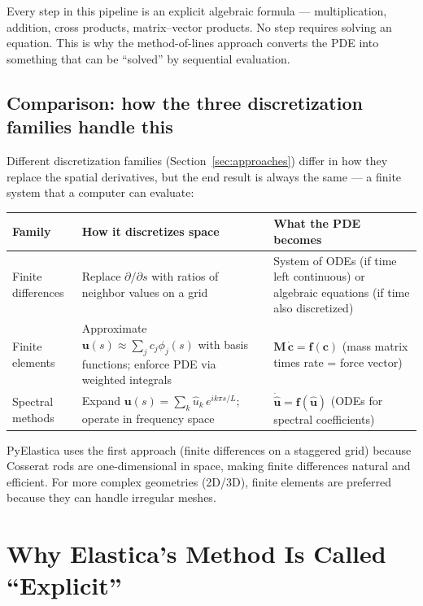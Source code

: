 \documentclass[11pt]{article}
\newcommand{\vect}[1]{\mathbf{#1}}
\newcommand{\mat}[1]{\mathbf{#1}}
\begin{document}
Every step in this pipeline is an explicit algebraic formula --- multiplication, addition, cross products, matrix--vector products.
No step requires solving an equation.
This is why the method-of-lines approach converts the PDE into something that can be ``solved'' by sequential evaluation.

\subsection{Comparison: how the three discretization families handle this}

Different discretization families (Section~\ref{sec:approaches}) differ in how they replace the spatial derivatives, but the end result is always the same --- a finite system that a computer can evaluate:

\begin{table}[H]
\centering
\renewcommand{\arraystretch}{1.3}
\begin{tabular}{@{}p{2.5cm}p{4cm}p{5cm}@{}}
\toprule
\textbf{Family} & \textbf{How it discretizes space} & \textbf{What the PDE becomes} \\
\midrule
Finite differences &
  Replace $\partial/\partial s$ with ratios of neighbor values on a grid &
  System of ODEs (if time left continuous) or algebraic equations (if time also discretized) \\[4pt]
Finite elements &
  Approximate $\vect{u}(s) \approx \sum_j c_j \phi_j(s)$ with basis functions; enforce PDE via weighted integrals &
  $\mat{M}\,\dot{\vect{c}} = \vect{f}(\vect{c})$ (mass matrix times rate = force vector) \\[4pt]
Spectral methods &
  Expand $\vect{u}(s) = \sum_k \hat{u}_k\, e^{ik\pi s/L}$; operate in frequency space &
  $\dot{\hat{\vect{u}}} = \vect{f}(\hat{\vect{u}})$ (ODEs for spectral coefficients) \\
\bottomrule
\end{tabular}
\end{table}

\noindent
PyElastica uses the first approach (finite differences on a staggered grid) because Cosserat rods are one-dimensional in space, making finite differences natural and efficient.
For more complex geometries (2D/3D), finite elements are preferred because they can handle irregular meshes.

\section{Why Elastica's Method Is Called ``Explicit''}
\label{sec:explicit}
\end{document}

